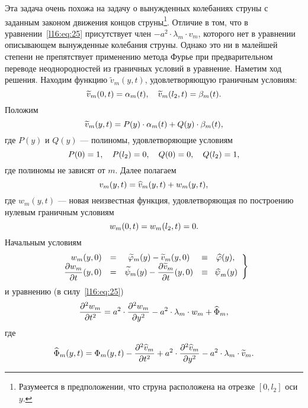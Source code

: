 \documentclass[12pt,a4paper,openany,fleqn]{book}
\newcommand{\pder}[2]{\ensuremath{\frac{\partial#1}{\partial#2}}}
\newcommand{\pdder}[2]{\ensuremath{\frac{\partial^2#1}{\partial#2^2}}}
\newcommand{\psihat}{\ensuremath{\widehat{\vphantom{\phi}\smash{\!\psi}}}}
\theoremstyle{definition}
\begin{document}
	Эта задача очень похожа на задачу о вынужденных колебаниях струны с заданным законом движения концов струны\footnote{Разумеется в предположении, что струна расположена на отрезке $[0,l_2]$ оси $y$.}. Отличие в том, что в уравнении~\eqref{l16:eq:25} присутствует член $-a^2\cdot\lambda_m\cdot v_m$, которого нет в уравнении описывающем вынужденные колебания струны. Однако это ни в малейшей степени не препятствует применению метода Фурье при предварительном переводе неоднородностей из граничных условий в уравнение. Наметим ход решения. Находим функцию $\widetilde{v}_m(y,t)$, удовлетворяющую граничным условиям: 
	\begin{equation*}
		\hfill\widetilde{v}_m(0,t)=\alpha_m(t),\quad\widetilde{v}_m(l_2,t)=\beta_m(t).\hfill
	\end{equation*}  
	Положим
	\begin{equation*}
		\hfill \widetilde{v}_m(y,t)=P(y)\cdot\alpha_m(t)+Q(y)\cdot\beta_m(t),\hfill
	\end{equation*}
	где $P(y)$ и $Q(y)$ --- полиномы, удовлетворяющие условиям 
	\begin{equation*}
		\hfill P(0)=1,\quad P(l_2)=0,\quad Q(0)=0,\quad Q(l_2)=1,\hfill
	\end{equation*}
	где полиномы не зависят от $m$. Далее полагаем 
	\begin{equation*}
		\hfill v_m(y,t)=\widehat{v}_m(y,t)+w_m(y,t),\hfill
	\end{equation*}
	где $w_m(y,t)$ --- новая неизвестная функция, удовлетворяющая по построению нулевым граничным условиям
	\begin{equation}\label{l16:eq:28}
		\hfill w_m(0,t)=w_m(l_2,t)=0.\hfill
	\end{equation}
	Начальным условиям 
	\begin{equation}\label{l16:eq:29}
		\hfill\left.\begin{array}{rcccl}
			w_m(y,0)&=&\widetilde{\phi}_m(y)-\widetilde{v}_m(y,0)&\equiv&\widehat{\phi}(y),\\
			\displaystyle \pder{w_m}{t}(y,0)&=&\displaystyle\widetilde{\psi}_m(y)-\pder{\widetilde{v}_m}{t}(y,0)&\equiv&\psihat_m(y)
		\end{array}\right\}\hfill
	\end{equation}
	и уравнению (в силу~\eqref{l16:eq:25})
	\begin{equation}\label{l16:eq:30}
		\hfill\pdder{w_m}{t}=a^2\cdot\pdder{w_m}{y}-a^2\cdot\lambda_m\cdot w_m+\widehat{\Phi}_m,\hfill
	\end{equation}
	где 
	\begin{equation*}
		\hfill\widehat{\Phi}_m(y,t)=\Phi_m(y,t)-\pdder{\widehat{v}_m}{t}+a^2\cdot\pdder{\widehat{v}_m}{y}-a^2\cdot\lambda_m\cdot \widetilde{v}_m.\hfill
	\end{equation*}
\end{document}
